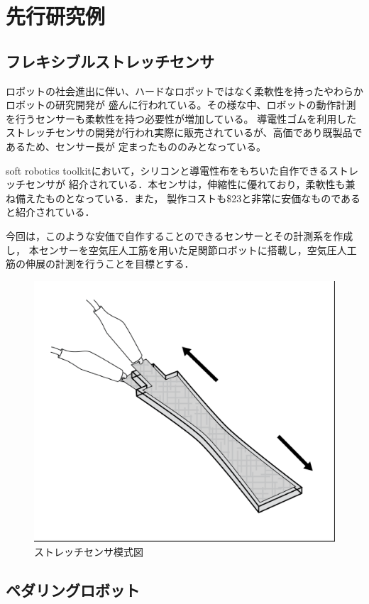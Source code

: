 \section{先行研究例}

\subsection{フレキシブルストレッチセンサ}%
ロボットの社会進出に伴い、ハードなロボットではなく柔軟性を持ったやわらかロボットの研究開発が
盛んに行われている。その様な中、ロボットの動作計測を行うセンサーも柔軟性を持つ必要性が増加している。
導電性ゴムを利用したストレッチセンサの開発が行われ実際に販売されているが、高価であり既製品であるため、センサー長が
定まったもののみとなっている。

soft robotics toolkit\cite{MITSoftRobot}において，シリコンと導電性布をもちいた自作できるストレッチセンサが
紹介されている．本センサは，伸縮性に優れており，柔軟性も兼ね備えたものとなっている．また，
製作コストも\$23と非常に安価なものであると紹介されている．

今回は，このような安価で自作することのできるセンサーとその計測系を作成し，
本センサーを空気圧人工筋を用いた足関節ロボットに搭載し，空気圧人工筋の伸展の計測を行うことを目標とする．
\begin{figure}[h]
    \begin{center}
        \includegraphics[width=0.5\columnwidth]{./1_prolusion/MITSoftRobotics.eps}
        \caption{ストレッチセンサ模式図\cite{MITSoftRobot}}
        \label{MITSoftRobot表紙}
    \end{center}
\end{figure}

\subsection{ペダリングロボット}

